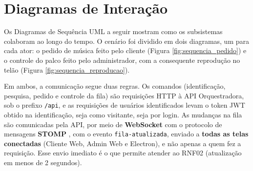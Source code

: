 \section{Diagramas de Interação}

\newcommand{\seqhead}[3]{%
  \node[draw, rounded corners=2pt, fill=blue!6, minimum width=2.5cm, minimum height=0.9cm, align=center, font=\scriptsize\bfseries] at (#1,0) {#2};
  \draw[dashed, gray] (#1,-0.45) -- (#1,#3);}
\newcommand{\seqlabel}[5]{%
  \pgfmathsetmacro{\seqw}{abs(#3-#2)-0.4}
  \draw[#1] (#2,#4) -- node[above, font=\scriptsize, align=center, text width=\seqw cm] {#5} (#3,#4);}
\newcommand{\seqcall}[4]{\seqlabel{-latex}{#1}{#2}{#3}{#4}}
\newcommand{\seqret}[4]{\seqlabel{dashed, ->}{#1}{#2}{#3}{#4}}
\newcommand{\seqasync}[4]{\seqlabel{->}{#1}{#2}{#3}{#4}}
\newcommand{\seqself}[3]{%
  \draw[-latex] (#1,#2) -- ++(0.5,0) -- ++(0,-0.35) -- ++(-0.5,0);
  \node[font=\scriptsize, anchor=south west, align=left, text width=2.8cm, xshift=1mm] at (#1,#2) {#3};}
\newcommand{\seqfrag}[6]{%
  \draw (#1,#3) rectangle (#2,#4);
  \node[draw, fill=white, anchor=north west, font=\scriptsize\bfseries, inner sep=2pt] at (#1,#3) {#5};
  \node[anchor=north west, font=\scriptsize, inner sep=2pt] at ({#1+0.55},#3) {[#6]};}
\newcommand{\seqelse}[4]{%
  \draw[dashed] (#1,#3) -- (#2,#3);
  \node[anchor=north west, font=\scriptsize] at (#1,#3) {[#4]};}

Os Diagramas de Sequência UML a seguir mostram como os subsistemas colaboram ao longo do tempo. O cenário foi dividido em dois diagramas, um para cada ator: o pedido de música feito pelo cliente (Figura \ref{fig:sequencia_pedido}) e o controle do palco feito pelo administrador, com a consequente reprodução no telão (Figura \ref{fig:sequencia_reproducao}).

Em ambos, a comunicação segue duas regras. Os comandos (identificação, pesquisa, pedido e controle da fila) são requisições HTTP à API Orquestradora, sob o prefixo \texttt{/api}, e as requisições de usuários identificados levam o token JWT obtido na identificação, seja como visitante, seja por login. As mudanças na fila são comunicadas pela API, por meio de \textbf{WebSocket} \cite{rfc6455} com o protocolo de mensagens \textbf{STOMP} \cite{stomp2012}, com o evento \texttt{fila-atualizada}, enviado a \textbf{todas as telas conectadas} (Cliente Web, Admin Web e Electron), e não apenas a quem fez a requisição. Esse envio imediato é o que permite atender ao RNF02 (atualização em menos de 2 segundos).

